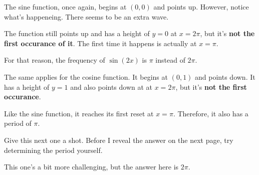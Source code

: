 The sine function, once again, begins at $(0,0)$ and points up. However, notice what's happeneing. There seems to be an extra wave. 

The function still points up and has a height of $y = 0$ at $x = 2\pi$, but it's \textbf{not the first occurance of it}. The first time it happens is actually at $x = \pi$.

For that reason, the frequency of $\sin(2x)$ is $\pi$ instead of $2\pi$.

The same applies for the cosine function. It begins at $(0,1)$ and points down. It has a height of $y = 1$ and also points down at at $x = 2\pi$, but it's \textbf{not the first occurance}.

Like the sine function, it reaches its first reset at $x = \pi$. Therefore, it also has a period of $\pi$.

Give this next one a shot. Before I reveal the answer on the next page, try determining the period yourself.
\begin{center}
\end{center}
This one's a bit more challenging, but the answer here is $2\pi$.

